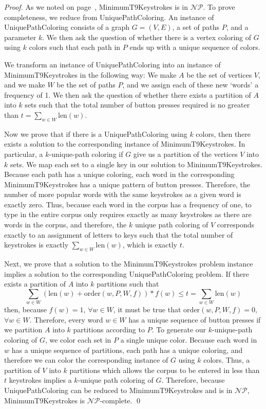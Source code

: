 \documentclass[runningheads]{llncs}
\newcommand{\NP}{\ensuremath{\mathcal{NP}}}
\begin{document}
\begin{proof}
As we noted on page~\pageref{minstrokesdecision}, {\sc MinimumT9Keystrokes} is
in \NP.  To prove completeness, we reduce from {\sc UniquePathColoring}.  An
instance of {\sc UniquePathColoring} consists of a graph $G=(V,E)$, a set of
paths $P$, and a parameter $k$.  We then ask the question of whether there is a
vertex coloring of $G$ using $k$ colors such that each path in $P$ ends up with
a unique sequence of colors.

We transform an instance of {\sc UniquePathColoring} into an instance of {\sc
MinimumT9Keystrokes} in the following way:  We make $A$ be the set of vertices
$V$, and we make $W$ be the set of paths $P$, and we assign each of these new
`words' a frequency of 1.  We then ask the question of whether there exists a
partition of $A$ into $k$ sets such that the total number of button presses
required is no greater than $t=\sum_{w\in W} \mathrm{len}(w)$.

Now we prove that if there is a {\sc UniquePathColoring} using $k$ colors, then
there exists a solution to the corresponding instance of {\sc
MinimumT9Keystrokes}.  In particular, a $k$-unique-path coloring if $G$ give us
a partition of the vertices $V$ into $k$ sets.  We map each set to a single key
in our solution to {\sc MinimumT9Keystrokes}.  Because each path has a unique
coloring, each word in the corresponding {\sc MinimumT9Keystrokes} has a unique
pattern of button presses.  Therefore, the number of more popular words with
the same keystrokes as a given word is exactly zero.  Thus, because each word
in the corpus has a frequency of one, to type in the entire corpus only
requires exactly as many keystrokes as there are words in the corpus, and
therefore, the $k$ unique path coloring of $V$ corresponds exactly to an
assignment of letters to keys such that the total number of keystrokes is
exactly $\sum_{w\in W} \mathrm{len}(w)$, which is exactly $t$.

Next, we prove that a solution to the {\sc MinimumT9Keystrokes} problem
instance implies a solution to the corresponding {\sc UniquePathColoring}
problem.  If there exists a partition of $A$ into $k$ partitions such that
$$\sum_{w\in W} (\mathrm{len}(w)+\mathrm{order}(w,P,W,f))*f(w) \le t =
\sum_{w\in W} \mathrm{len}(w)$$ then, because $f(w) = 1$, $ \forall w \in W$,
it must be true that $\mathrm{order}(w,P,W,f) = 0$,  $\forall w \in W$.
Therefore, every word $w \in W$ has a unique sequence of button presses if we
partition $A$ into $k$ partitions according to $P$.  To generate our
$k$-unique-path coloring of $G$, we color each set in $P$ a single unique
color.  Because each word in $w$ has a unique sequence of partitions, each path
has a unique coloring, and therefore we can color the corresponding instance of
$G$ using $k$ colors.  Thus, a partition of $V$ into $k$ partitions which allows the corpus to be entered in less than $t$ keystrokes implies a $k$-unique path coloring of $G$.  Therefore, because {\sc UniquePathColoring} can be reduced to {\sc MinimumT9Keystrokes} and is in \NP, {\sc MinimumT9Keystrokes} is \NP-complete.
\qed
\end{proof}
\end{document}
